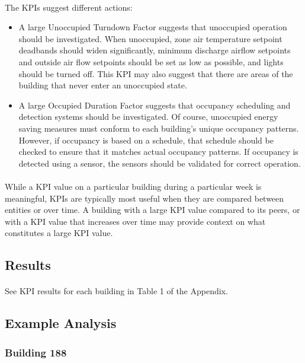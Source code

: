 \documentclass[a4paper]{article}
\begin{document}
\paragraph{}
The KPIs suggest different actions:
\begin{itemize}
\item{A large Unoccupied Turndown Factor suggests that unoccupied operation should be investigated. When unoccupied, zone air temperature setpoint deadbands should widen significantly, minimum discharge airflow setpoints and outside air flow setpoints should be set as low as possible, and lights should be turned off. This KPI may also suggest that there are areas of the building that never enter an unoccupied state.}
\item{A large Occupied Duration Factor suggests that occupancy scheduling and detection systems should be investigated. Of course, unoccupied energy saving measures must conform to each building's unique occupancy patterns. However, if occupancy is based on a schedule, that schedule should be checked to ensure that it matches actual occupancy patterns. If occupancy is detected using a sensor, the sensors should be validated for correct operation.}
\end{itemize}

\paragraph{}
While a KPI value on a particular building during a particular week is meaningful, KPIs are typically most useful when they are compared between entities or over time. A building with a large KPI value compared to its peers, or with a KPI value that increases over time may provide context on what constitutes a large KPI value.

\subsection{Results}

\paragraph{}
See KPI results for each building in Table 1 of the Appendix.

\subsection{Example Analysis}

\subsubsection{Building 188}
\end{document}
